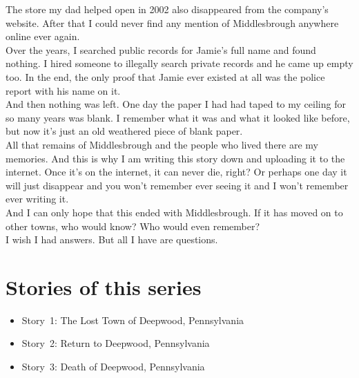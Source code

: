 \documentclass[a5paper]{scrartcl}
\begin{document}
The store my dad helped open in 2002 also disappeared from the company's website. After that I could never find any mention of Middlesbrough anywhere online ever again.\\


Over the years, I searched public records for Jamie's full name and found nothing. I hired someone to illegally search private records and he came up empty too. In the end, the only proof that Jamie ever existed at all was the police report with his name on it.\\


And then nothing was left.  One day the paper I had had taped to my ceiling for so many years was blank. I remember what it was and what it looked like before, but now it's just an old weathered piece of blank paper.\\


All that remains of Middlesbrough and the people who lived there are my memories. And this is why I am writing this story down and uploading it to the internet. Once it's on the internet, it can never die, right? Or perhaps one day it will just disappear and you won't remember ever seeing it and I won't remember ever writing it.\\


And I can only hope that this ended with Middlesbrough. If it has moved on to other towns, who would know? Who would even remember? \\


I wish I had answers. But all I have are questions.
\clearpage
\section*{Stories of this series}

\begin{itemize}
    \item Story~1: The Lost Town of Deepwood, Pennsylvania
    \item Story~2: Return to Deepwood, Pennsylvania
    \item Story~3: Death of Deepwood, Pennsylvania
\end{itemize}
\end{document}
